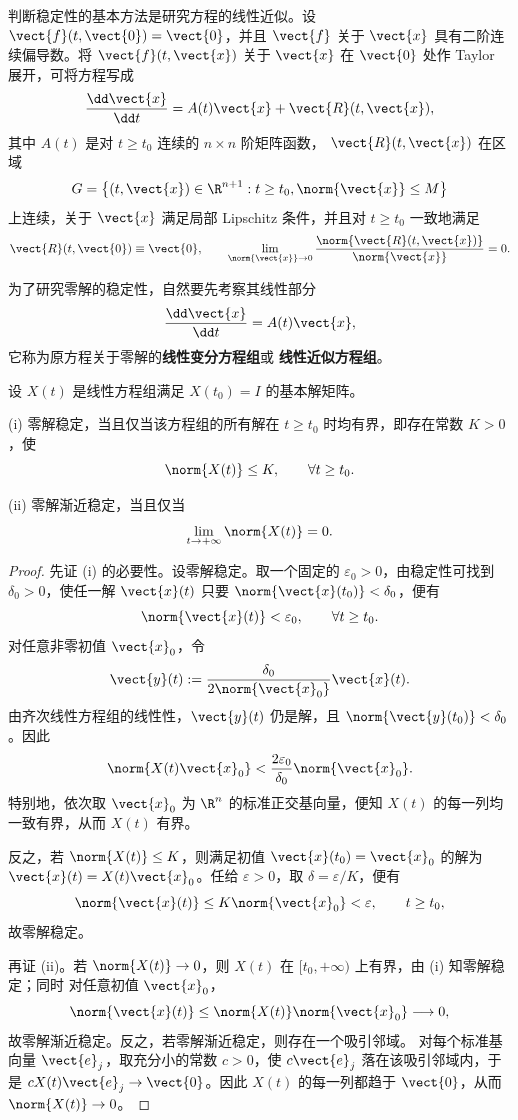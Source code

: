 判断稳定性的基本方法是研究方程的线性近似。设
$\vect{f}(t,\vect{0})=\vect{0}$，并且 $\vect{f}$ 关于
$\vect{x}$ 具有二阶连续偏导数。将 $\vect{f}(t,\vect{x})$ 关于
$\vect{x}$ 在 $\vect{0}$ 处作 Taylor 展开，可将方程写成
\[
	\dfrac{\dd\vect{x}}{\dd t}
	=A(t)\vect{x}+\vect{R}(t,\vect{x}),
\]
其中 $A(t)$ 是对 $t\geq t_0$ 连续的 $n\times n$ 阶矩阵函数，
$\vect{R}(t,\vect{x})$ 在区域
\[
	G=\left\{
	(t,\vect{x})\in\R^{n+1}:
	t\geq t_0,
	\norm{\vect{x}}\leq M
	\right\}
\]
上连续，关于 $\vect{x}$ 满足局部 Lipschitz 条件，并且对
$t\geq t_0$ 一致地满足
\[
	\vect{R}(t,\vect{0})\equiv\vect{0},
	\qquad
	\lim_{\norm{\vect{x}}\to0}
	\dfrac{\norm{\vect{R}(t,\vect{x})}}
	{\norm{\vect{x}}}=0.
\]

为了研究零解的稳定性，自然要先考察其线性部分
\[
	\dfrac{\dd\vect{x}}{\dd t}=A(t)\vect{x},
\]
它称为原方程关于零解的\textbf{线性变分方程组}或
\textbf{线性近似方程组}。

\begin{lemma}\label{lem:线性系统零解稳定性判据}
	设 $X(t)$ 是线性方程组满足 $X(t_0)=I$ 的基本解矩阵。

	\textnormal{(i)} 零解稳定，当且仅当该方程组的所有解在
	$t\geq t_0$ 时均有界，即存在常数 $K>0$，使
	\[
		\norm{X(t)}\leq K,
		\qquad \forall t\geq t_0.
	\]

	\textnormal{(ii)} 零解渐近稳定，当且仅当
	\[
		\lim_{t\to+\infty}\norm{X(t)}=0.
	\]
\end{lemma}

\begin{proof}
	先证 \textnormal{(i)} 的必要性。设零解稳定。取一个固定的
	$\varepsilon_0>0$，由稳定性可找到 $\delta_0>0$，使任一解
$\vect{x}(t)$ 只要 $\norm{\vect{x}(t_0)}<\delta_0$，便有
	\[
		\norm{\vect{x}(t)}<\varepsilon_0,
		\qquad \forall t\geq t_0.
	\]
	对任意非零初值 $\vect{x}_0$，令
	\[
		\vect{y}(t)
		\mathrel{:=}
		\dfrac{\delta_0}{2\norm{\vect{x}_0}}\vect{x}(t).
	\]
	由齐次线性方程组的线性性，$\vect{y}(t)$ 仍是解，且
	$\norm{\vect{y}(t_0)}<\delta_0$。因此
	\[
		\norm{X(t)\vect{x}_0}
		<\dfrac{2\varepsilon_0}{\delta_0}
		\norm{\vect{x}_0}.
	\]
	特别地，依次取 $\vect{x}_0$ 为 $\R^n$ 的标准正交基向量，便知
	$X(t)$ 的每一列均一致有界，从而 $X(t)$ 有界。

	反之，若 $\norm{X(t)}\leq K$，则满足初值
	$\vect{x}(t_0)=\vect{x}_0$ 的解为
	$\vect{x}(t)=X(t)\vect{x}_0$。任给 $\varepsilon>0$，取
	$\delta=\varepsilon/K$，便有
	\[
		\norm{\vect{x}(t)}
		\leq K\norm{\vect{x}_0}<\varepsilon,
		\qquad t\geq t_0,
	\]
	故零解稳定。

	再证 \textnormal{(ii)}。若 $\norm{X(t)}\to0$，则 $X(t)$ 在
	$[t_0,+\infty)$ 上有界，由 \textnormal{(i)} 知零解稳定；同时
	对任意初值 $\vect{x}_0$，
	\[
		\norm{\vect{x}(t)}
		\leq\norm{X(t)}\norm{\vect{x}_0}\longrightarrow0,
	\]
	故零解渐近稳定。反之，若零解渐近稳定，则存在一个吸引邻域。
	对每个标准基向量 $\vect{e}_j$，取充分小的常数 $c>0$，使
	$c\vect{e}_j$ 落在该吸引邻域内，于是
	$cX(t)\vect{e}_j\to\vect{0}$。因此 $X(t)$ 的每一列都趋于
	$\vect{0}$，从而 $\norm{X(t)}\to0$。
\end{proof}

